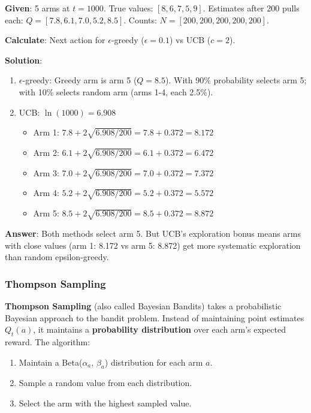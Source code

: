 \documentclass[11pt,a4paper]{article}
\begin{document}
\begin{tcolorbox}[colback=green!5!white,colframe=green!75!black,title=\textbf{Worked Example 9: UCB vs Epsilon-Greedy Comparison}]
\textbf{Given}: 5 arms at $t = 1000$. True values: $[8, 6, 7, 5, 9]$. Estimates after 200 pulls each: $Q = [7.8, 6.1, 7.0, 5.2, 8.5]$. Counts: $N = [200, 200, 200, 200, 200]$.

\textbf{Calculate}: Next action for $\epsilon$-greedy ($\epsilon = 0.1$) vs UCB ($c = 2$).

\textbf{Solution}:
\begin{enumerate}
    \item $\epsilon$-greedy: Greedy arm is arm 5 ($Q = 8.5$). With 90\% probability selects arm 5; with 10\% selects random arm (arms 1-4, each 2.5\%).
    \item UCB: $\ln(1000) = 6.908$
    \begin{itemize}
        \item Arm 1: $7.8 + 2\sqrt{6.908/200} = 7.8 + 0.372 = 8.172$
        \item Arm 2: $6.1 + 2\sqrt{6.908/200} = 6.1 + 0.372 = 6.472$
        \item Arm 3: $7.0 + 2\sqrt{6.908/200} = 7.0 + 0.372 = 7.372$
        \item Arm 4: $5.2 + 2\sqrt{6.908/200} = 5.2 + 0.372 = 5.572$
        \item Arm 5: $8.5 + 2\sqrt{6.908/200} = 8.5 + 0.372 = 8.872$
    \end{itemize}
\end{enumerate}

\textbf{Answer}: Both methods select arm 5. But UCB's exploration bonus means arms with close values (arm 1: 8.172 vs arm 5: 8.872) get more systematic exploration than random epsilon-greedy.
\end{tcolorbox}

\subsubsection{Thompson Sampling}

\textbf{Thompson Sampling} (also called Bayesian Bandits) takes a probabilistic Bayesian approach to the bandit problem. Instead of maintaining point estimates $Q_t(a)$, it maintains a \textbf{probability distribution} over each arm's expected reward. The algorithm:

\begin{enumerate}
    \item Maintain a Beta($\alpha_a$, $\beta_a$) distribution for each arm $a$.
    \item Sample a random value from each distribution.
    \item Select the arm with the highest sampled value.
\end{enumerate}
\end{document}
